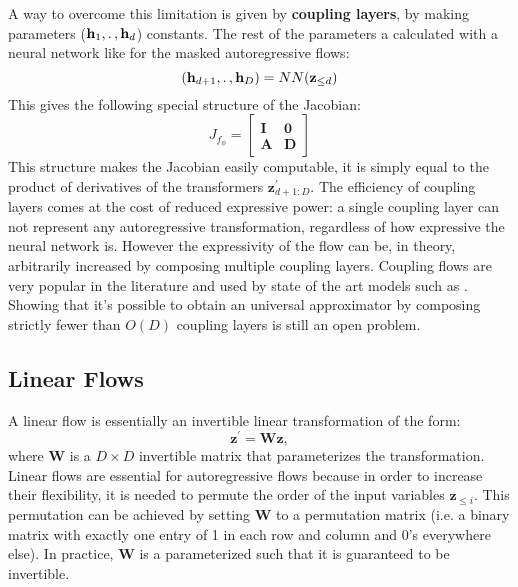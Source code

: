 \documentclass[english]{scrartcl}
\begin{document}
    A way to overcome this limitation is given by \textbf{coupling layers}, by making parameters ($\textbf{h}_1, \ldotp, \textbf{h}_d$) constants.
    The rest of the parameters a calculated with a neural network like for the masked autoregressive flows:
    \begin{equation}
    (\textbf{h}_{d+1}, \ldotp, \textbf{h}_D)
        = NN(\textbf{z}_{\leq d})
    \end{equation}
    This gives the following special structure of the Jacobian:
    \begin{equation}
        J_{f_{\phi}} = \begin{bmatrix}
                           \textbf{I} & \textbf{0}\\
                           \textbf{A} & \textbf{D}
        \end{bmatrix}
    \end{equation}
    This structure makes the Jacobian easily computable, it is simply equal to the product of derivatives of the
    transformers $\textbf{z}^{\prime}_{d+1:D}$.
    The efficiency of coupling layers comes at the cost of reduced expressive power: a single coupling layer can not represent
    any autoregressive transformation, regardless of how expressive the neural network is.
    However the expressivity of the flow can be, in theory, arbitrarily increased by composing multiple coupling layers.
    Coupling flows are very popular in the literature and used by state of the art models such as \citep[NICE, Glow, WaveGlow, Flow++][]{dinh_nice_2015,kingma_glow_2018, prenger_waveglow_2019, ho_flow_2019}.
    Showing that it's possible to obtain an universal approximator by composing strictly fewer than $O(D)$ coupling layers is still an open problem.

    \subsection{Linear Flows}
    A linear flow is essentially an invertible linear transformation of the form:
    \begin{equation}
        \textbf{z}^{\prime} = \textbf{W} \textbf{z},
    \end{equation}
    where $\textbf{W}$ is a $D \times D$ invertible matrix that parameterizes the transformation.
    Linear flows are essential for autoregressive flows because in order to increase their flexibility, it is needed to permute the order of the input variables $\textbf{z}_{\leq i}$.
    This permutation can be achieved by setting $\textbf{W}$ to a permutation matrix (i.e. a binary matrix with exactly one entry of 1 in each row and column and 0's everywhere else).
    In practice, $\textbf{W}$ is a parameterized such that it is guaranteed to be invertible.
\end{document}
